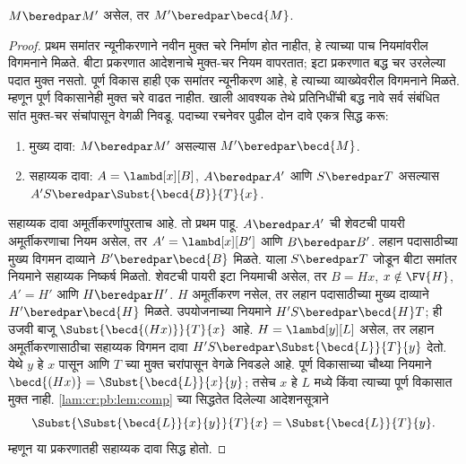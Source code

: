 \begin{lem}\label{lam:cr:pbe:lem:cont}
  $M \beredpar M'$ असेल, तर $M' \beredpar \becd{M}$.
\end{lem}

\begin{proof}

प्रथम समांतर न्यूनीकरणाने नवीन मुक्त चरे निर्माण होत नाहीत,
हे त्याच्या पाच नियमांवरील विगमनाने मिळते. बीटा प्रकरणात
आदेशनाचे मुक्त-चर नियम वापरतात; इटा प्रकरणात बद्ध चर
उरलेल्या पदात मुक्त नसतो. पूर्ण विकास हाही एक समांतर
न्यूनीकरण आहे, हे त्याच्या व्याख्येवरील विगमनाने मिळते.
म्हणून पूर्ण विकासानेही मुक्त चरे वाढत नाहीत. खाली आवश्यक
तेथे प्रतिनिधींची बद्ध नावे सर्व संबंधित सांत मुक्त-चर
संचांपासून वेगळी निवडू.
पदाच्या रचनेवर पुढील दोन दावे एकत्र सिद्ध करू:
\begin{enumerate}
\item मुख्य दावा: $M\beredpar M'$ असल्यास
$M'\beredpar\becd{M}$.
\item सहाय्यक दावा: $A=\lambd[x][B]$, $A\beredpar A'$
आणि $S\beredpar T$ असल्यास
$A'S\beredpar\Subst{\becd{B}}{T}{x}$.
\end{enumerate}
सहाय्यक दावा अमूर्तीकरणांपुरताच आहे. तो प्रथम पाहू.
$A\beredpar A'$ ची शेवटची पायरी अमूर्तीकरणाचा नियम
असेल, तर $A'=\lambd[x][B']$ आणि $B\beredpar B'$.
लहान पदासाठीच्या मुख्य विगमन दाव्याने
$B'\beredpar\becd{B}$ मिळते. याला $S\beredpar T$
जोडून बीटा समांतर नियमाने सहाय्यक निष्कर्ष मिळतो.
शेवटची पायरी इटा नियमाची असेल, तर $B=Hx$,
$x\notin\FV{H}$, $A'=H'$ आणि $H\beredpar H'$.
$H$ अमूर्तीकरण नसेल, तर लहान पदासाठीच्या मुख्य दाव्याने
$H'\beredpar\becd{H}$ मिळते. उपयोजनाच्या नियमाने
$H'S\beredpar\becd{H}T$; ही उजवी बाजू
$\Subst{\becd{(Hx)}}{T}{x}$ आहे.
$H=\lambd[y][L]$ असेल, तर लहान अमूर्तीकरणासाठीचा
सहाय्यक विगमन दावा
$H'S\beredpar\Subst{\becd{L}}{T}{y}$ देतो.
येथे $y$ हे $x$ पासून आणि $T$ च्या मुक्त चरांपासून
वेगळे निवडले आहे. पूर्ण विकासाच्या चौथ्या नियमाने
$\becd{(Hx)}=\Subst{\becd{L}}{x}{y}$; तसेच $x$
हे $L$ मध्ये किंवा त्याच्या पूर्ण विकासात मुक्त नाही.
\ref{lam:cr:pb:lem:comp} च्या सिद्धतेत दिलेल्या आदेशनसूत्राने
\[\Subst{\Subst{\becd{L}}{x}{y}}{T}{x}
=\Subst{\becd{L}}{T}{y}.
\]
म्हणून या प्रकरणातही सहाय्यक दावा सिद्ध होतो.


\end{proof}
